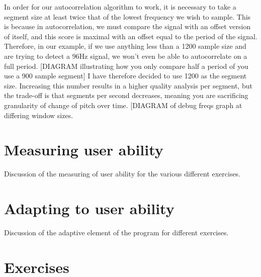 In order for our autocorrelation algorithm to work, it is  necessary to take a segment size at least twice that of the lowest frequency we wish to sample.
This is because in autocorrelation, we must compare the signal with an offset version of itself, and this score is maximal with an offset equal to the period of the signal. Therefore, in our example, if we use anything less than a 1200 sample size and are trying to detect a 96Hz signal, we won't even be able to autocorrelate on a full period. [DIAGRAM illustrating how you only compare half a period of you use a 900 sample segment] I have therefore decided to use 1200 as the segment size. Increasing this number results in a higher quality analysis per segment, but the trade-off is that segments per second decreases, meaning you are sacrificing granularity of change of pitch over time. [DIAGRAM of debug freqs graph at differing window sizes.
		
\section{Measuring user ability}
Discussion of the measuring of user ability for the various different exercises.
\section{Adapting to user ability}
Discussion of the adaptive element of the program for different exercises.
\section{Exercises}


